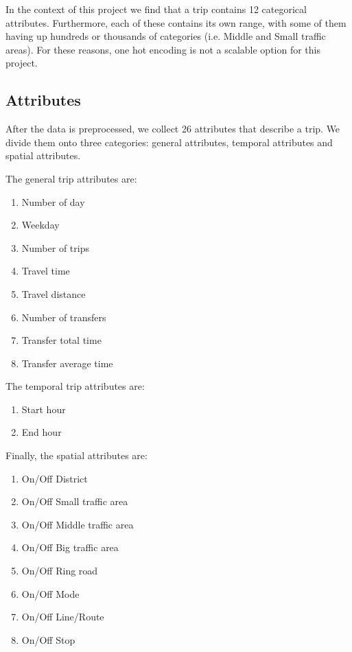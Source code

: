 \documentclass{article}
\begin{document}
In the context of this project we find that a trip contains 12 categorical attributes. Furthermore, each of these contains its own range, with some of them having up hundreds or thousands of categories (i.e. Middle and Small traffic areas). For these reasons, one hot encoding is not a scalable option for this project.


\subsection{Attributes}
\label{sec:attributes}
After the data is preprocessed, we collect 26 attributes that describe a trip. We divide them onto three categories: general attributes, temporal attributes and spatial attributes. 

The general trip attributes are: 

\begin{enumerate}
\item Number of day
\item Weekday
\item Number of trips
\item Travel time
\item Travel distance
\item Number of transfers
\item Transfer total time
\item Transfer average time
\end{enumerate}

The temporal trip attributes are:
 
\begin{enumerate}
\item Start hour
\item End hour
\end{enumerate}

Finally, the spatial attributes are:

\begin{enumerate}
\item On/Off District
\item On/Off Small traffic area
\item On/Off Middle traffic area
\item On/Off Big traffic area
\item On/Off Ring road
\item On/Off Mode
\item On/Off Line/Route
\item On/Off Stop
\end{enumerate}
\end{document}
